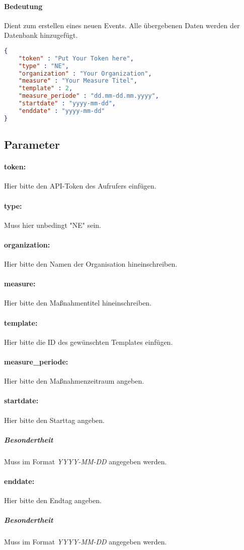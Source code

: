 \documentclass[12pt,parskip=full, pagea4]{scrreprt}
\begin{document}
    		\paragraph{Bedeutung} Dient zum erstellen eines neuen Events. Alle \"ubergebenen Daten werden der Datenbank hinzugef\"ugt.
			\begin{lstlisting}[language=JSON]
{
	"token" : "Put Your Token here",
	"type" : "NE",
	"organization" : "Your Organization",
	"measure" : "Your Measure Titel",
	"template" : 2,
	"measure_periode" : "dd.mm-dd.mm.yyyy",
	"startdate" : "yyyy-mm-dd",
	"enddate" : "yyyy-mm-dd"
}
			\end{lstlisting}
			\subsection{Parameter}
			\paragraph{token:}Hier bitte den API-Token des Aufrufers einf\"ugen.
			\paragraph{type:}Muss hier unbedingt "NE" sein.
			\paragraph{organization:}Hier bitte den Namen der Organisation hineinschreiben.
			\paragraph{measure:}Hier bitte den Maßnahmentitel hineinschreiben.
			\paragraph{template:}Hier bitte die ID des gew\"unschten Templates einf\"ugen.
			\paragraph{measure\_periode:}Hier bitte den Maßnahmenzeitraum angeben.
			\paragraph{startdate:}Hier bitte den Starttag angeben.
			\subparagraph{Besondertheit} \leftskip=1.5cm Muss im Format \textit{YYYY-MM-DD} angegeben werden.
			\paragraph{enddate:} \leftskip=0cm Hier bitte den Endtag angeben.
			\subparagraph{Besondertheit} \leftskip=1.5cm Muss im Format \textit{YYYY-MM-DD} angegeben werden.
			
\end{document}

